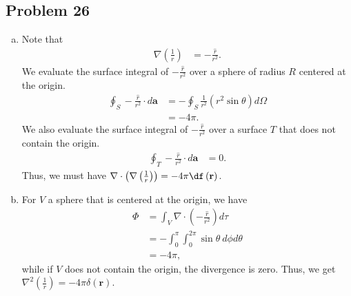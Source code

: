 \documentclass[10pt]{mypackage}
\begin{document}
\subsection{Problem 26}%
\begin{enumerate}[(a)]
  \item Note that
    \begin{align*}
      \nabla \left(\frac{1}{r}\right) &= -\frac{\hat{r}}{r^2}.
    \end{align*}
    We evaluate the surface integral of $-\frac{\hat{r}}{r^2}$ over a sphere of radius $R$ centered at the origin.
    \begin{align*}
      \oint_{S}-\frac{\hat{r}}{r^2}\cdot d\mathbf{a} &= -\oint_{S} \frac{1}{r^2}\left(r^2\sin\theta\right)d\Omega\\
                                                     &= -4\pi.
    \end{align*}
    We also evaluate the surface integral of $-\frac{\hat{r}}{r^2}$ over a surface $T$ that does not contain the origin.
    \begin{align*}
      \oint_{T}-\frac{\hat{r}}{r^2}\cdot d\mathbf{a} &= 0.
    \end{align*}
    Thus, we must have $\nabla \cdot \left(\nabla\left(\frac{1}{r}\right)\right) = -4\pi \df\left(\mathbf{r}\right)$.
  \item For $V$ a sphere that is centered at the origin, we have
    \begin{align*}
      \Phi &= \int_{V}\nabla\cdot \left(-\frac{\hat{r}}{r^2}\right)d\tau\\
           &= -\int_{0}^{\pi}\int_{0}^{2\pi} \sin\theta\:d\phi d\theta\\
           &= -4\pi,
    \end{align*}
    while if $V$ does not contain the origin, the divergence is zero. Thus, we get $\nabla^2\left(\frac{1}{r}\right) = -4\pi\delta\left(\mathbf{r}\right)$.
\end{enumerate}
\end{document}
